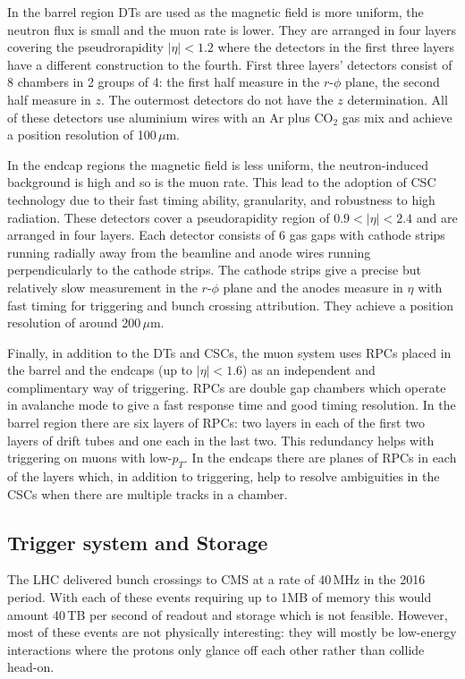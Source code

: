 In the barrel region DTs are used as the magnetic field is more uniform, the neutron flux is small and the muon rate is lower. They are arranged in four layers covering the pseudrorapidity $|\eta|<1.2$ where the detectors in the first three layers have a different construction to the fourth. First three layers' detectors consist of 8 chambers in 2 groups of 4: the first half measure in the $r$-$\phi$ plane, the second half measure in $z$. The outermost detectors do not have the $z$ determination. All of these detectors use aluminium wires with an Ar plus CO$_{2}$ gas mix and achieve a position resolution of 100\,$\mu$m.


In the endcap regions the magnetic field is less uniform, the neutron-induced background is high and so is the muon rate. This lead to the adoption of CSC technology due to their fast timing ability, granularity, and robustness to high radiation. 
These detectors cover a pseudorapidity region of $0.9<|\eta|<2.4$ and are arranged in four layers. Each detector consists of 6 gas gaps with cathode strips running radially away from the beamline and anode wires running perpendicularly to the cathode strips. The cathode strips give a precise but relatively slow measurement in the $r$-$\phi$ plane and the anodes measure in $\eta$ with fast timing for triggering and bunch crossing attribution. They achieve a position resolution of around 200\,$\mu$m. 


Finally, in addition to the DTs and CSCs, the muon system uses RPCs placed in the barrel and the endcaps (up to $|\eta|<1.6$) as an independent and complimentary way of triggering. 
RPCs are double gap chambers which operate in avalanche mode to give a fast response time and good timing resolution. In the barrel region there are six layers of RPCs: two layers in each of the first two layers of drift tubes and one each in the last two. This redundancy helps with triggering on muons with low-$p_{T}$. In the endcaps there are planes of RPCs in each of the layers which, in addition to triggering, help to resolve ambiguities in the CSCs when there are multiple tracks in a chamber. 


\subsection{Trigger system and Storage}
The LHC delivered bunch crossings to CMS at a rate of 40\,MHz in the 2016 period. With each of these events requiring up to 1MB of memory this would amount 40\,TB per second of readout and storage which is not feasible. 
However, most of these events are not physically interesting: they will mostly be low-energy interactions where the protons only glance off each other rather than collide head-on. 

